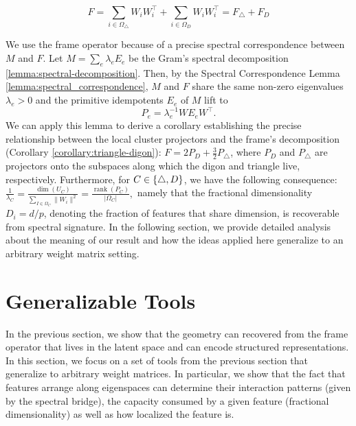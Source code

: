 \documentclass{article}
\theoremstyle{plain}
\numberwithin{equation}{section}
\theoremstyle{definition}
\theoremstyle{remark}
\begin{document}
 \vspace{-10pt}
 \begin{equation}
 F= \sum_{i\in \Omega_\triangle}W_iW_i^\top + \sum_{i\in \Omega_D}W_iW_i^\top = F_\triangle + F_D
 \end{equation}

We use the frame operator because of a precise spectral correspondence between $M$ and $F$. Let $M = \sum_e \lambda_e E_e$ be the Gram's spectral decomposition \ref{lemma:spectral-decomposition}. Then, by the Spectral Correspondence Lemma \ref{lemma:spectral_correspondence}, $M$ and $F$ share the same non-zero eigenvalues $\lambda_e>0$ and the primitive idempotents $E_e$ of $M$ lift to 
 \begin{equation}
 \label{equation:spectral_decomposition}
    P_e=\lambda_e^{-1}WE_eW^\top.
 \end{equation}
 We can apply this lemma to derive a corollary establishing the precise relationship between the local cluster projectors and the frame's decomposition (Corollary \ref{corollary:triangle-digon}): $F = 2P_D+\frac{3}{2}P_\triangle$, where $P_D$ and $P_\triangle$ are projectors onto the subspaces along which the digon and triangle live, respectively. Furthermore, for $C\in \mathcal\{\triangle, D\}$, we have the following consequence: $\frac{1}{\lambda_C} = \frac{\dim (U_C)}{\sum_{I\in \Omega_C}\|W_i\|^2}= \frac{\operatorname{rank}(P_C)}{|\Omega_C|},$ namely that the fractional dimensionality $D_i=d/p$, denoting the fraction of features that share dimension, is recoverable from spectral signature. In the following section, we provide detailed analysis about the meaning of our result and how the ideas applied here generalize to an arbitrary weight matrix setting.

\section{Generalizable Tools}
\label{section:generalizable}
In the previous section, we show that the geometry can recovered from the frame operator that lives in the latent space and can encode structured representations. In this section, we focus on a set of tools from the previous section that generalize to arbitrary weight matrices. In particular,  we show that the fact that features arrange along eigenspaces can determine their interaction patterns (given by the spectral bridge), the capacity consumed by a given feature (fractional dimensionality) as well as how localized the feature is.
\end{document}
